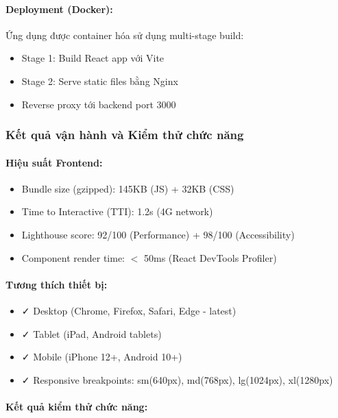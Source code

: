 \paragraph{Deployment (Docker):}

Ứng dụng được container hóa sử dụng multi-stage build:

\begin{itemize}
    \item Stage 1: Build React app với Vite
    \item Stage 2: Serve static files bằng Nginx
    \item Reverse proxy tới backend port 3000
\end{itemize}

\subsubsection{Kết quả vận hành và Kiểm thử chức năng}

\paragraph{Hiệu suất Frontend:}
\begin{itemize}
    \item Bundle size (gzipped): 145KB (JS) + 32KB (CSS)
    \item Time to Interactive (TTI): 1.2s (4G network)
    \item Lighthouse score: 92/100 (Performance) + 98/100 (Accessibility)
    \item Component render time: $<$ 50ms (React DevTools Profiler)
\end{itemize}

\paragraph{Tương thích thiết bị:}
\begin{itemize}
    \item ✓ Desktop (Chrome, Firefox, Safari, Edge - latest)
    \item ✓ Tablet (iPad, Android tablets)
    \item ✓ Mobile (iPhone 12+, Android 10+)
    \item ✓ Responsive breakpoints: sm(640px), md(768px), lg(1024px), xl(1280px)
\end{itemize}

\paragraph{Kết quả kiểm thử chức năng:}

